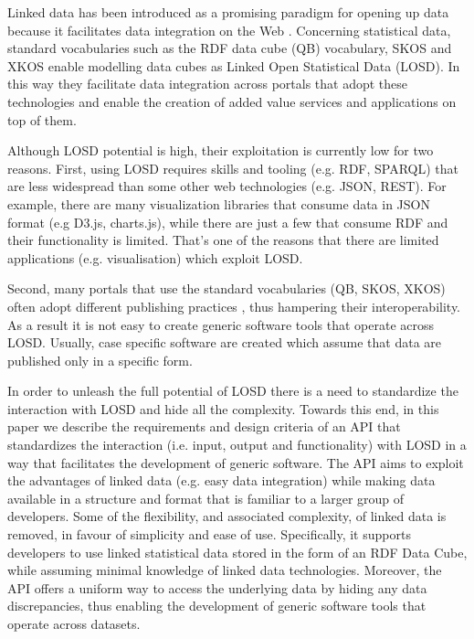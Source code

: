 \documentclass{llncs}
\begin{document}
Linked data has been introduced as a promising paradigm for opening up data because it facilitates data integration on the Web \cite{Bizer:2009}. Concerning statistical data, standard vocabularies such as the RDF data cube (QB) vocabulary\cite{Cyganiak:2014:W3C}, SKOS\cite{Miles:2009:W3C} and XKOS\cite{XKOS} enable modelling data cubes as Linked Open Statistical Data (LOSD). In this way they facilitate data integration across portals that adopt these technologies and enable the creation of added value services and applications on top of them.

Although LOSD potential is high, their exploitation is currently low for two reasons. First, using LOSD requires skills and tooling (e.g. RDF, SPARQL) that are less widespread than some other web technologies (e.g. JSON, REST). For example, there are many visualization libraries that consume data in JSON format (e.g D3.js, charts.js), while there are just a few that consume RDF and their functionality is limited. That's one of the reasons that there are limited applications (e.g. visualisation) which exploit LOSD.

Second, many portals that use the standard vocabularies (QB, SKOS, XKOS) often adopt different publishing practices \cite{KalampokisChallenges}, thus hampering their interoperability. As a result it is not easy to create generic software tools that operate across LOSD. Usually, case specific software \cite{KaramanouResultsSoFar} are created which assume that data are published only in a specific form. 

In order to unleash the full potential of LOSD there is a need to standardize the interaction with LOSD and hide all the complexity. Towards this end, in this paper we describe the requirements and design criteria of an API that standardizes the interaction (i.e. input, output and functionality) with LOSD in a way that facilitates the development of generic software. The API aims to exploit the advantages of linked data (e.g. easy data integration) while making data available in a structure and format that is familiar to a larger group of developers.  Some of the flexibility, and associated complexity, of linked data is removed, in favour of simplicity and ease of use. Specifically, it supports developers to use linked statistical data stored in the form of an RDF Data Cube, while assuming minimal knowledge of linked data technologies. Moreover, the API offers a uniform way to access the underlying data by hiding any data discrepancies, thus enabling the development of generic software tools that operate across datasets. 
\end{document}
